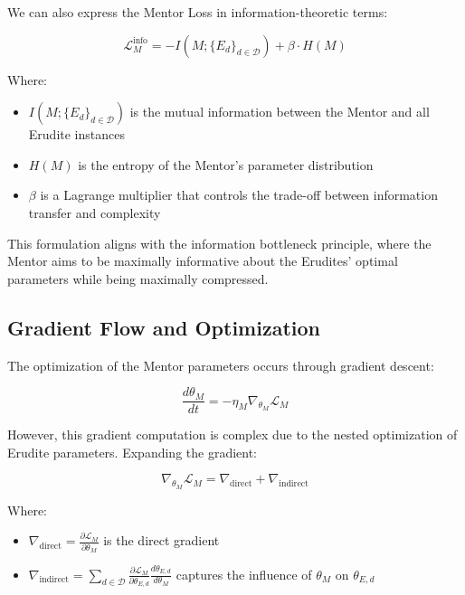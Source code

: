 We can also express the Mentor Loss in information-theoretic terms:

\begin{equation}
\mathcal{L}_M^{\text{info}} = -I(M; \{E_d\}_{d \in \mathcal{D}}) + \beta \cdot H(M)
\end{equation}

Where:
\begin{itemize}
\item $I(M; \{E_d\}_{d \in \mathcal{D}})$ is the mutual information between the Mentor and all Erudite instances
\item $H(M)$ is the entropy of the Mentor's parameter distribution
\item $\beta$ is a Lagrange multiplier that controls the trade-off between information transfer and complexity
\end{itemize}

This formulation aligns with the information bottleneck principle, where the Mentor aims to be maximally informative about the Erudites' optimal parameters while being maximally compressed.

\subsection{Gradient Flow and Optimization}

The optimization of the Mentor parameters occurs through gradient descent:

\begin{equation}
\frac{d\theta_M}{dt} = -\eta_M \nabla_{\theta_M} \mathcal{L}_M
\end{equation}

However, this gradient computation is complex due to the nested optimization of Erudite parameters. Expanding the gradient:

\begin{equation}
\nabla_{\theta_M} \mathcal{L}_M = \nabla_{\text{direct}} + \nabla_{\text{indirect}}
\end{equation}

Where:
\begin{itemize}
\item $\nabla_{\text{direct}} = \frac{\partial \mathcal{L}_M}{\partial \theta_M}$ is the direct gradient
\item $\nabla_{\text{indirect}} = \sum_{d \in \mathcal{D}} \frac{\partial \mathcal{L}_M}{\partial \theta_{E,d}} \frac{d\theta_{E,d}}{d\theta_M}$ captures the influence of $\theta_M$ on $\theta_{E,d}$
\end{itemize}

